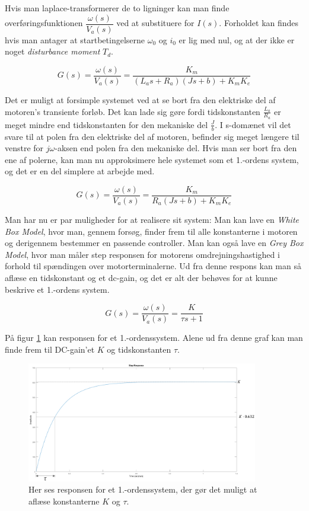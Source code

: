 Hvis man laplace-transformerer de to ligninger kan man finde overføringsfunktionen $\dfrac{\omega(s)}{V_{a}(s)}$ ved at substituere for $I(s)$. Forholdet kan findes hvis man antager at startbetingelserne $\omega_{0}$ og $i_{0}$ er lig med nul, og at der ikke er noget \textit{disturbance moment} $T_{d}$.

\begin{equation}
G(s)=\dfrac{\omega(s)}{V_{a}(s)}=\dfrac{K_{m}}{(L_{a}s+R_{a})(Js+b)+K_{m}K_{e}}
\end{equation}

Det er muligt at forsimple systemet ved at se bort fra den elektriske del af motoren's transiente forløb. Det kan lade sig gøre fordi tidskonstanten $\frac{L_{a}}{R_{a}}$ er meget mindre end tidskonstanten for den mekaniske del $\frac{J}{b}$. I s-domænet vil det svare til at polen fra den elektriske del af motoren, befinder sig meget længere til venstre for $j\omega$-aksen end polen fra den mekaniske del. Hvis man ser bort fra den ene af polerne, kan man nu approksimere hele systemet som et 1.-ordens system, og det er en del simplere at arbejde med.

\begin{equation}
G(s)=\dfrac{\omega(s)}{V_{a}(s)}=\dfrac{K_{m}}{R_{a}(Js+b)+K_{m}K_{e}}
\end{equation}

Man har nu er par muligheder for at realisere sit system: Man kan lave en \textit{White Box Model}, hvor man, gennem forsøg, finder frem til alle konstanterne i motoren og derigennem bestemmer en passende controller. Man kan også lave en \textit{Grey Box Model}, hvor man måler step responsen for motorens omdrejningshastighed i forhold til spændingen over motorterminalerne. Ud fra denne respons kan man så aflæse en tidskonstant og et dc-gain, og det er alt der behøves for at kunne beskrive et 1.-ordens system. 

\begin{equation}\label{eq:tf_pan_tilt}
G(s)=\dfrac{\omega(s)}{V_{a}(s)}=\dfrac{K}{\tau s+1}
\end{equation}

På figur \ref{fig:time_constant} kan responsen for et 1.-ordenssystem. Alene ud fra denne graf kan man finde frem til DC-gain'et $K$ og tidskonstanten $\tau$.

\begin{figure}[H]
			\begin{center}
			\includegraphics[width=0.9\textwidth]{Billeder/Time_Constant.PNG}
			\end{center}
			\caption{Her ses responsen for et 1.-ordenssystem, der gør det muligt at aflæse konstanterne $K$ og $\tau$.}
			\label{fig:time_constant}
\end{figure}